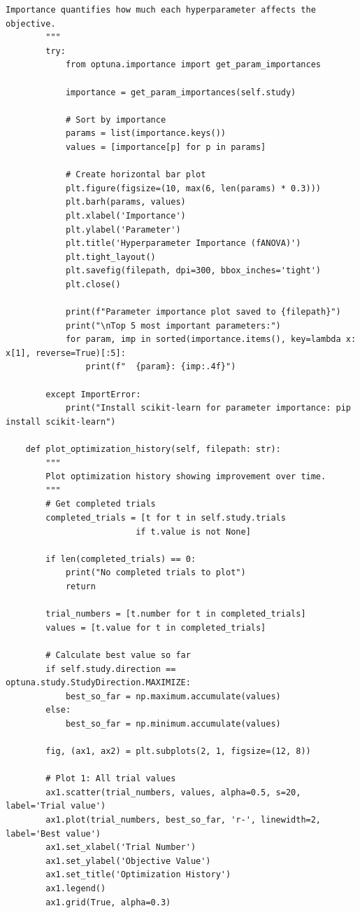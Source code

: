 \begin{lstlisting}[style=python, caption=Comprehensive HPO analysis and visualization]
        Importance quantifies how much each hyperparameter affects the objective.
        """
        try:
            from optuna.importance import get_param_importances

            importance = get_param_importances(self.study)

            # Sort by importance
            params = list(importance.keys())
            values = [importance[p] for p in params]

            # Create horizontal bar plot
            plt.figure(figsize=(10, max(6, len(params) * 0.3)))
            plt.barh(params, values)
            plt.xlabel('Importance')
            plt.ylabel('Parameter')
            plt.title('Hyperparameter Importance (fANOVA)')
            plt.tight_layout()
            plt.savefig(filepath, dpi=300, bbox_inches='tight')
            plt.close()

            print(f"Parameter importance plot saved to {filepath}")
            print("\nTop 5 most important parameters:")
            for param, imp in sorted(importance.items(), key=lambda x: x[1], reverse=True)[:5]:
                print(f"  {param}: {imp:.4f}")

        except ImportError:
            print("Install scikit-learn for parameter importance: pip install scikit-learn")

    def plot_optimization_history(self, filepath: str):
        """
        Plot optimization history showing improvement over time.
        """
        # Get completed trials
        completed_trials = [t for t in self.study.trials
                          if t.value is not None]

        if len(completed_trials) == 0:
            print("No completed trials to plot")
            return

        trial_numbers = [t.number for t in completed_trials]
        values = [t.value for t in completed_trials]

        # Calculate best value so far
        if self.study.direction == optuna.study.StudyDirection.MAXIMIZE:
            best_so_far = np.maximum.accumulate(values)
        else:
            best_so_far = np.minimum.accumulate(values)

        fig, (ax1, ax2) = plt.subplots(2, 1, figsize=(12, 8))

        # Plot 1: All trial values
        ax1.scatter(trial_numbers, values, alpha=0.5, s=20, label='Trial value')
        ax1.plot(trial_numbers, best_so_far, 'r-', linewidth=2, label='Best value')
        ax1.set_xlabel('Trial Number')
        ax1.set_ylabel('Objective Value')
        ax1.set_title('Optimization History')
        ax1.legend()
        ax1.grid(True, alpha=0.3)


\end{lstlisting}
